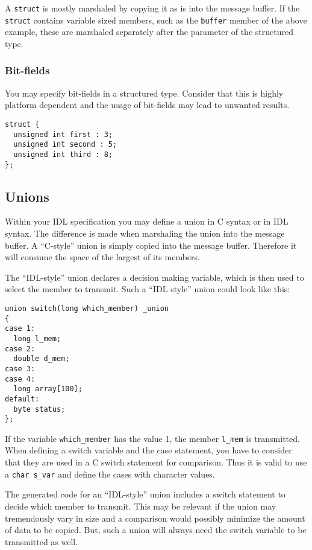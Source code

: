 
A \verb|struct| is mostly marshaled by copying it as is into the message
buffer. If the \verb|struct| contains variable sized members, such as the
\verb|buffer| member of the above example, these are marshaled separately
after the parameter of the structured type.


\subsubsection{Bit-fields}

You may specify bit-fields in a structured type. Consider that this is highly
platform dependent and the usage of bit-fields may lead to unwanted results.

\begin{verbatim}
struct {
  unsigned int first : 3;
  unsigned int second : 5;
  unsigned int third : 8;
};
\end{verbatim}

\subsection{Unions}

Within your IDL specification you may define a union in C syntax or in IDL
syntax. The difference is made when marshaling the union into the message
buffer. A ``C-style'' union is simply copied into the message buffer.
Therefore it will consume the space of the largest of its members.

The ``IDL-style'' union declares a decision making variable, which is then
used to select the member to transmit. Such a ``IDL style'' union could look
like this:

\begin{verbatim}
union switch(long which_member) _union
{
case 1:
  long l_mem;
case 2:
  double d_mem;
case 3:
case 4:
  long array[100];
default:
  byte status;
};
\end{verbatim}

If the variable \verb|which_member| has the value 1, the member \verb|l_mem|
is transmitted. When defining a switch variable and the case statement, you
have to consider that they are used in a C switch statement for comparison.
Thus it is valid to use a \verb|char s_var| and define the cases with
character values.

The generated code for an ``IDL-style'' union includes a switch statement to
decide which member to transmit. This may be relevant if the union may
tremendously vary in size and a comparison would possibly minimize the amount
of data to be copied. But, such a union will always need the switch variable
to be transmitted as well.

